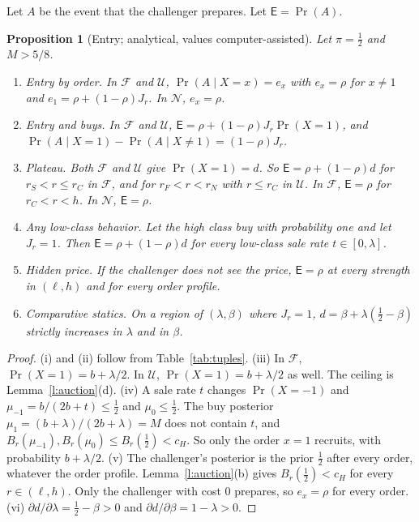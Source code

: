 \documentclass[12pt]{article}
\newtheorem{proposition}{Proposition}
\theoremstyle{definition}
\newcommand{\Ent}{\mathsf E}
\newcommand{\cH}{c_H}
\begin{document}
Let $A$ be the event that the challenger prepares.
Let $\Ent=\Pr(A)$.

\begin{proposition}[Entry; analytical, values computer-assisted]\label{p:entry}
Let $\pi=\tfrac12$ and $M>5/8$.
\begin{enumerate}[label=(\roman*)]
\item \emph{Entry by order.} In $\mathcal F$ and $\mathcal U$, $\Pr(A\mid X=x)=e_x$ with $e_x=\rho$ for $x\ne1$ and $e_1=\rho+(1-\rho)J_r$. In $\mathcal N$, $e_x=\rho$.
\item \emph{Entry and buys.} In $\mathcal F$ and $\mathcal U$, $\Ent=\rho+(1-\rho)J_r\Pr(X=1)$, and $\Pr(A\mid X=1)-\Pr(A\mid X\ne1)=(1-\rho)J_r$.
\item \emph{Plateau.} Both $\mathcal F$ and $\mathcal U$ give $\Pr(X=1)=d$. So $\Ent=\rho+(1-\rho)d$ for $r_S<r\le r_C$ in $\mathcal F$, and for $r_F<r<r_N$ with $r\le r_C$ in $\mathcal U$. In $\mathcal F$, $\Ent=\rho$ for $r_C<r<h$. In $\mathcal N$, $\Ent=\rho$.
\item \emph{Any low-class behavior.} Let the high class buy with probability one and let $J_r=1$. Then $\Ent=\rho+(1-\rho)d$ for every low-class sale rate $t\in[0,\lambda]$.
\item \emph{Hidden price.} If the challenger does not see the price, $\Ent=\rho$ at every strength in $(\ell,h)$ and for every order profile.
\item \emph{Comparative statics.} On a region of $(\lambda,\beta)$ where $J_r=1$, $d=\beta+\lambda(\tfrac12-\beta)$ strictly increases in $\lambda$ and in $\beta$.
\end{enumerate}
\end{proposition}

\begin{proof}
(i) and (ii) follow from Table~\ref{tab:tuples}.
(iii) In $\mathcal F$, $\Pr(X=1)=b+\lambda/2$.
In $\mathcal U$, $\Pr(X=1)=b+\lambda/2$ as well.
The ceiling is Lemma~\ref{l:auction}(d).
(iv) A sale rate $t$ changes $\Pr(X=-1)$ and $\mu_{-1}=b/(2b+t)\le\tfrac12$ and $\mu_0\le\tfrac12$.
The buy posterior $\mu_1=(b+\lambda)/(2b+\lambda)=M$ does not contain $t$, and $B_r(\mu_{-1}),B_r(\mu_0)\le B_r(\tfrac12)<\cH$.
So only the order $x=1$ recruits, with probability $b+\lambda/2$.
(v) The challenger's posterior is the prior $\tfrac12$ after every order, whatever the order profile.
Lemma~\ref{l:auction}(b) gives $B_r(\tfrac12)<\cH$ for every $r\in(\ell,h)$.
Only the challenger with cost $0$ prepares, so $e_x=\rho$ for every order.
(vi) $\partial d/\partial\lambda=\tfrac12-\beta>0$ and $\partial d/\partial\beta=1-\lambda>0$.
\end{proof}
\end{document}

